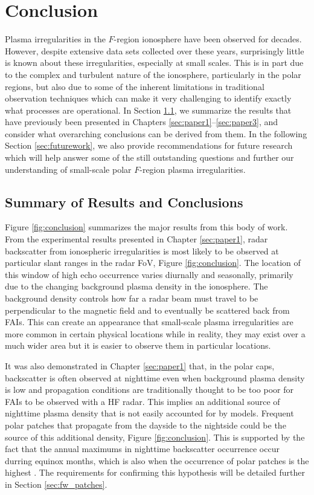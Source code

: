 
\chapter{Conclusion}
\label{sec:conclusion}

Plasma irregularities in the \(F\)-region ionosphere have been observed for decades.  However, despite extensive data sets collected over these years, surprisingly little is known about these irregularities, especially at small scales.  This is in part due to the complex and turbulent nature of the ionosphere, particularly in the polar regions, but also due to some of the inherent limitations in traditional observation techniques which can make it very challenging to identify exactly what processes are operational.  In Section \ref{sec:summary}, we summarize the results that have previously been presented in Chapters \ref{sec:paper1}--\ref{sec:paper3}, and consider what overarching conclusions can be derived from them.  In the following Section \ref{sec:futurework}, we also provide recommendations for future research which will help answer some of the still outstanding questions and further our understanding of small-scale polar \(F\)-region plasma irregularities.

\section{Summary of Results and Conclusions}
\label{sec:summary}

Figure \ref{fig:conclusion} summarizes the major results from this body of work.  From the experimental results presented in Chapter \ref{sec:paper1}, radar backscatter from ionospheric irregularities is most likely to be observed at particular slant ranges in the radar FoV, Figure \ref{fig:conclusion}.  The location of this window of high echo occurrence varies diurnally and seasonally, primarily due to the changing background plasma density in the ionosphere.  The background density controls how far a radar beam must travel to be perpendicular to the magnetic field and to eventually be scattered back from FAIs.  This can create an appearance that small-scale plasma irregularities are more common in certain physical locations while in reality, they may exist over a much wider area but it is easier to observe them in particular locations. 

It was also demonstrated in Chapter \ref{sec:paper1} that, in the polar caps, backscatter is often observed at nighttime even when background plasma density is low and propagation conditions are traditionally thought to be too poor for FAIs to be observed with a HF radar.  This implies an additional source of nighttime plasma density that is not easily accounted for by models.  Frequent polar patches that propagate from the dayside to the nightside could be the source of this additional density, Figure \ref{fig:conclusion}.  This is supported by the fact that the annual maximums in nighttime backscatter occurrence occur durring equinox months, which is also when the occurrence of polar patches is the highest \citep{Rodger1996}.  The requirements for confirming this hypothesis will be detailed further in Section \ref{sec:fw_patches}.

